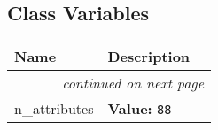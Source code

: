 
  \subsection{Class Variables}

    \vspace{-1cm}
\hspace{\varindent}\begin{longtable}{|p{\varnamewidth}|p{\vardescrwidth}|l}
\cline{1-2}
\cline{1-2} \centering \textbf{Name} & \centering \textbf{Description}& \\
\cline{1-2}
\endhead\cline{1-2}\multicolumn{3}{r}{\small\textit{continued on next page}}\\\endfoot\cline{1-2}
\endlastfoot\raggedright n\-\_\-a\-t\-t\-r\-i\-b\-u\-t\-e\-s\- & \raggedright \textbf{Value:} 
{\tt 88}&\\
\cline{1-2}
\end{longtable}

